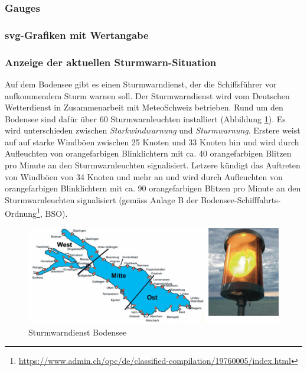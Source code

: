 \subsubsection{Gauges}
\newline

\subsubsection{svg-Grafiken mit Wertangabe}
\newline


\subsubsection{Anzeige der aktuellen Sturmwarn-Situation}
\label{subsec:sturmwarnung}

Auf dem Bodensee gibt es einen Sturmwarndienst, der die Schiffsführer vor aufkommendem Sturm warnen soll. Der Sturmwarndienst wird vom Deutschen Wetterdienst in Zusammenarbeit mit MeteoSchweiz betrieben. Rund um den Bodensee sind dafür über 60 Sturmwarnleuchten installiert (Abbildung \ref{img:sturm2}). Es wird unterschieden zwischen \textit{Starkwindwarnung} und \textit{Sturmwarnung}. Erstere weist auf auf starke Windböen zwischen 25 Knoten und 33 Knoten hin und wird durch Aufleuchten von orangefarbigen Blinklichtern mit ca. 40 orangefarbigen Blitzen pro Minute an den Sturmwarnleuchten signalisiert. Letzere kündigt das Auftreten von Windböen von 34 Knoten und mehr an und wird durch Aufleuchten von orangefarbigen Blinklichtern mit ca. 90 orangefarbigen Blitzen pro Minute an den Sturmwarnleuchten signalisiert (gemäss Anlage B der Bodensee-Schifffahrts-Ordnung\footnote{ \url{https://www.admin.ch/opc/de/classified-compilation/19760005/index.html}}, BSO).

\begin{figure}[h!]
	\centering
	\includegraphics[width=1\linewidth]{img/sturm2}
	\caption{Sturmwarndienst Bodensee}
	\label{img:sturm2}
\end{figure}


